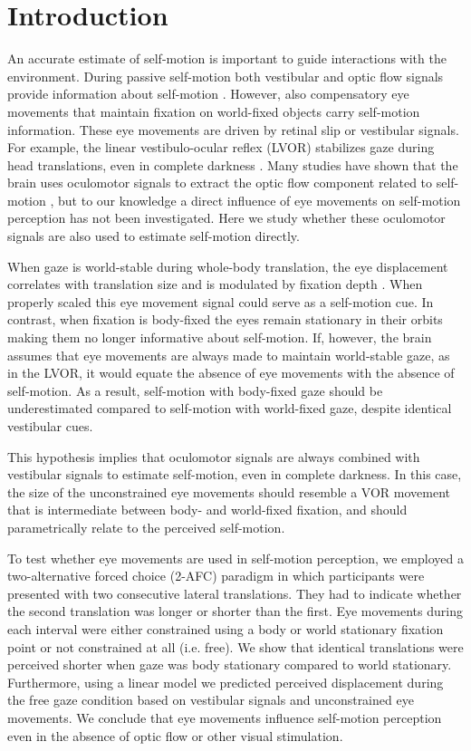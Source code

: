 \section{Introduction}

An accurate estimate of self-motion is important to guide interactions with the environment. During passive self-motion both vestibular and optic flow signals provide information about self-motion \cite{gibson1955, benson1986, harris2000, israel1989, angelaki2005, carriot2013, chen2010}. However, also compensatory eye movements that maintain fixation on world-fixed objects carry self-motion information. These eye movements are driven by retinal slip or vestibular signals. For example, the linear vestibulo-ocular reflex (LVOR) stabilizes gaze during head translations, even in complete darkness \cite{paige1989,medendorp2002,angelaki2004}.  Many studies have shown that the brain uses oculomotor signals to extract the optic flow component related to self-motion \cite{warren1988, royden1992, freeman1998, lappe1999}, but to our knowledge a direct influence of eye movements on self-motion perception has not been investigated. Here we study whether these oculomotor signals are also used to estimate self-motion directly.

When gaze is world-stable during whole-body translation, the eye displacement correlates with translation size and is modulated by fixation depth \cite{schwarz1989, paige1998, mchenry2000, medendorp2002}. When properly scaled this eye movement signal could serve as a self-motion cue. In contrast, when fixation is body-fixed the eyes remain stationary in their orbits \cite{paige1998, ramat2005} making them no longer informative about self-motion. If, however, the brain assumes that eye movements are always made to maintain world-stable gaze, as in the LVOR, it would equate the absence of eye movements with the absence of self-motion. As a result, self-motion with body-fixed gaze should be underestimated compared to self-motion with world-fixed gaze, despite identical vestibular cues.

 This hypothesis implies that oculomotor signals are always combined with vestibular signals to estimate self-motion, even in complete darkness.  In this case, the size of the unconstrained eye movements should resemble a VOR movement that is intermediate between body- and world-fixed fixation, and should parametrically relate to the perceived self-motion.

To test whether eye movements are used in self-motion perception, we employed a two-alternative forced choice (2-AFC) paradigm in which participants were presented with two consecutive lateral translations. They had to indicate whether the second translation was longer or shorter than the first. Eye movements during each interval were either constrained using a  body or world stationary fixation point or not constrained at all (i.e. free). We show that identical translations were perceived shorter when gaze was body stationary compared to world stationary. Furthermore, using a linear model we predicted perceived displacement during the free gaze condition based on vestibular signals and unconstrained eye movements. We conclude that eye movements influence self-motion perception even in the absence of optic flow or other visual stimulation. 